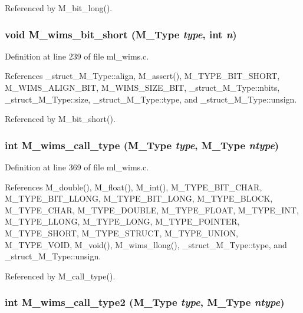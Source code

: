Referenced by M\_\-bit\_\-long().
\subsubsection{\setlength{\rightskip}{0pt plus 5cm}void M\_\-wims\_\-bit\_\-short (\bf{M\_\-Type} {\em type}, int {\em n})}\label{m__wims_8h_2873a1e517d17841f6b590b42a7fde1e}




Definition at line 239 of file ml\_\-wims.c.

References \_\-struct\_\-M\_\-Type::align, M\_\-assert(), M\_\-TYPE\_\-BIT\_\-SHORT, M\_\-WIMS\_\-ALIGN\_\-BIT, M\_\-WIMS\_\-SIZE\_\-BIT, \_\-struct\_\-M\_\-Type::nbits, \_\-struct\_\-M\_\-Type::size, \_\-struct\_\-M\_\-Type::type, and \_\-struct\_\-M\_\-Type::unsign.

Referenced by M\_\-bit\_\-short().
\subsubsection{\setlength{\rightskip}{0pt plus 5cm}int M\_\-wims\_\-call\_\-type (\bf{M\_\-Type} {\em type}, \bf{M\_\-Type} {\em ntype})}\label{m__wims_8h_69f1561aed1b0887a159687d8a744c58}




Definition at line 369 of file ml\_\-wims.c.

References M\_\-double(), M\_\-float(), M\_\-int(), M\_\-TYPE\_\-BIT\_\-CHAR, M\_\-TYPE\_\-BIT\_\-LLONG, M\_\-TYPE\_\-BIT\_\-LONG, M\_\-TYPE\_\-BLOCK, M\_\-TYPE\_\-CHAR, M\_\-TYPE\_\-DOUBLE, M\_\-TYPE\_\-FLOAT, M\_\-TYPE\_\-INT, M\_\-TYPE\_\-LLONG, M\_\-TYPE\_\-LONG, M\_\-TYPE\_\-POINTER, M\_\-TYPE\_\-SHORT, M\_\-TYPE\_\-STRUCT, M\_\-TYPE\_\-UNION, M\_\-TYPE\_\-VOID, M\_\-void(), M\_\-wims\_\-llong(), \_\-struct\_\-M\_\-Type::type, and \_\-struct\_\-M\_\-Type::unsign.

Referenced by M\_\-call\_\-type().
\subsubsection{\setlength{\rightskip}{0pt plus 5cm}int M\_\-wims\_\-call\_\-type2 (\bf{M\_\-Type} {\em type}, \bf{M\_\-Type} {\em ntype})}\label{m__wims_8h_f0f53b2aba589382fc3407ffcd8c585a}




